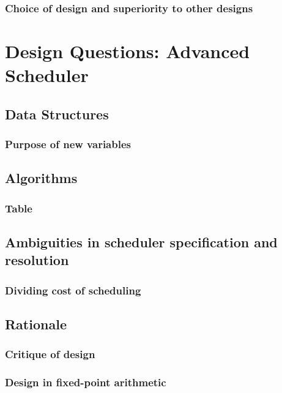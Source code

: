 \documentclass{article}
\renewcommand{\_}{\char`_}
\begin{document}
\subsubsection{Choice of design and superiority to other designs}

\newpage

\section{Design Questions: Advanced Scheduler}
\subsection{Data Structures}
\subsubsection{Purpose of new variables}

\subsection{Algorithms}
\subsubsection{Table}
\subsection{Ambiguities in scheduler specification and resolution}
\subsubsection{Dividing cost of scheduling}

\subsection{Rationale}
\subsubsection{Critique of design}

\subsubsection{Design in fixed-point arithmetic}


\end{document}
